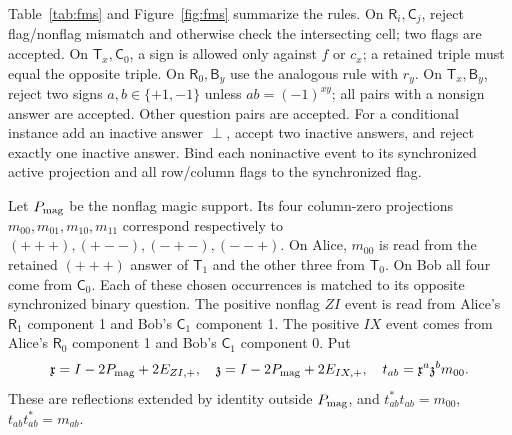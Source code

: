 Table~\ref{tab:fms} and Figure~\ref{fig:fms} summarize the rules. On $\mathsf R_i,\mathsf C_j$, reject flag/nonflag mismatch and otherwise check the intersecting cell; two flags are accepted. On $\mathsf T_x,\mathsf C_0$, a sign is allowed only against $f$ or $c_x$; a retained triple must equal the opposite triple. On $\mathsf R_0,\mathsf B_y$ use the analogous rule with $r_y$. On $\mathsf T_x,\mathsf B_y$, reject two signs $a,b\in\{+1,-1\}$ unless $ab=(-1)^{xy}$; all pairs with a nonsign answer are accepted. Other question pairs are accepted. For a conditional instance add an inactive answer $\perp$, accept two inactive answers, and reject exactly one inactive answer. Bind each noninactive event to its synchronized active projection and all row/column flags to the synchronized flag.

Let $P_{\rm mag}$ be the nonflag magic support. Its four column-zero projections $m_{00},m_{01},m_{10},m_{11}$ correspond respectively to $(+++),(+--),(-+-),(--+)$. On Alice, $m_{00}$ is read from the retained $(+++)$ answer of $\mathsf T_1$ and the other three from $\mathsf T_0$. On Bob all four come from $\mathsf C_0$. Each of these chosen occurrences is matched to its opposite synchronized binary question. The positive nonflag $ZI$ event is read from Alice's $\mathsf R_1$ component 1 and Bob's $\mathsf C_1$ component 1. The positive $IX$ event comes from Alice's $\mathsf R_0$ component 1 and Bob's $\mathsf C_1$ component 0. Put
\[
 \mathfrak x=I-2P_{\rm mag}+2E_{ZI,+},\quad \mathfrak z=I-2P_{\rm mag}+2E_{IX,+},\quad
 t_{ab}=\mathfrak x^a\mathfrak z^bm_{00}.
\]
These are reflections extended by identity outside $P_{\rm mag}$, and $t_{ab}^*t_{ab}=m_{00}$, $t_{ab}t_{ab}^*=m_{ab}$.

